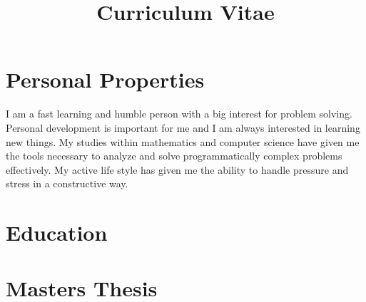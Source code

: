 \documentclass[11pt,a4paper,sans]{moderncv} %
\title{Curriculum Vitae}
\begin{document}
\makecvtitle


\section{Personal Properties}
I am a fast learning and humble person with a big interest for problem solving. Personal development is important for me and I am always interested in learning new things. My studies within mathematics and computer science have given me the tools necessary to analyze and solve programmatically complex problems effectively. My active life style has given me the ability to handle pressure and stress in a constructive way.


\section{Education}


\section{Masters Thesis}


\end{document}
